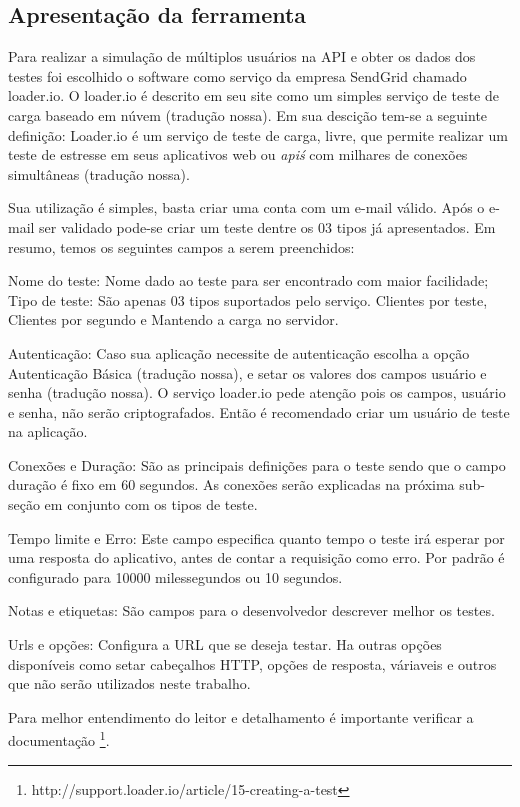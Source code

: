 \subsection{Apresentação da ferramenta}
  
  Para realizar a simulação de múltiplos usuários na \ac{API} e obter os dados dos testes foi 
  escolhido o software como serviço da empresa SendGrid chamado loader.io. O loader.io é descrito em seu site
  como um simples serviço de teste de carga baseado em núvem (tradução nossa). Em sua descição tem-se a seguinte
  definição: Loader.io é um serviço de teste de carga, livre, que permite realizar um teste de estresse em 
  seus aplicativos web ou \textit{api\'s} com milhares de conexões simultâneas (tradução nossa).
  
  Sua utilização é simples, basta criar uma conta com um e-mail válido. Após o e-mail ser validado pode-se 
  criar um teste dentre os 03 tipos já apresentados. Em resumo, temos os seguintes campos a serem preenchidos:
  
  Nome do teste: Nome dado ao teste para ser encontrado com maior facilidade;
  Tipo de teste: São apenas 03 tipos suportados pelo serviço. Clientes por teste, Clientes por segundo e Mantendo 
  a carga no servidor.
  
  Autenticação: Caso sua aplicação necessite de autenticação escolha a opção Autenticação Básica (tradução nossa),
  e setar os valores dos campos usuário e senha (tradução nossa). O serviço loader.io pede atenção 
  pois os campos, usuário e senha, não serão criptografados. Então é recomendado criar um usuário de teste na aplicação.
  
  Conexões e Duração: São as principais definições para o teste sendo que o campo duração
  é fixo em 60 segundos. As conexões serão explicadas na próxima sub-seção em conjunto com os tipos de teste.
  
  Tempo limite e Erro: Este campo especifica quanto tempo o teste irá esperar por uma resposta do aplicativo, antes
  de contar a requisição como erro. Por padrão é configurado para 10000 milessegundos ou 10 segundos.
  
  Notas e etiquetas: São campos para o desenvolvedor descrever  melhor os testes.
  
  Urls e opções: Configura a \ac{URL} que se deseja testar. Ha outras opções disponíveis como setar cabeçalhos \ac{HTTP},
  opções de resposta, váriaveis e outros que não serão utilizados neste trabalho.
  
  Para melhor entendimento do leitor e detalhamento é importante verificar 
  a documentação \footnote{http://support.loader.io/article/15-creating-a-test}.
  
